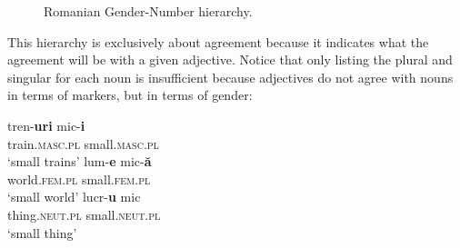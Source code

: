 \begin{figure}
    \caption{Romanian Gender-Number hierarchy.} \label{fig:romanian-hierar}
\end{figure}

This hierarchy is exclusively about agreement because it indicates what the agreement will be with a given adjective. Notice that only listing the plural and singular for each noun is insufficient because adjectives do not agree with nouns in terms of markers, but in terms of gender:

\begin{exe}
    \ex
    \begin{xlist}
        \ex 
        \gll tren-\textbf{uri} mic-\textbf{i}\\
        train.\textsc{masc.pl} small.\textsc{masc.pl}\\
        \glt `small trains'
        \ex 
        \gll lum-\textbf{e} mic-\textbf{ă}\\
        world.\textsc{fem.pl} small.\textsc{fem.pl}\\
        \glt `small world'
        \ex 
        \gll lucr-\textbf{u} mic\\
        thing.\textsc{neut.pl} small.\textsc{neut.pl}\\
        \glt `small thing'
    \end{xlist}
\end{exe}

